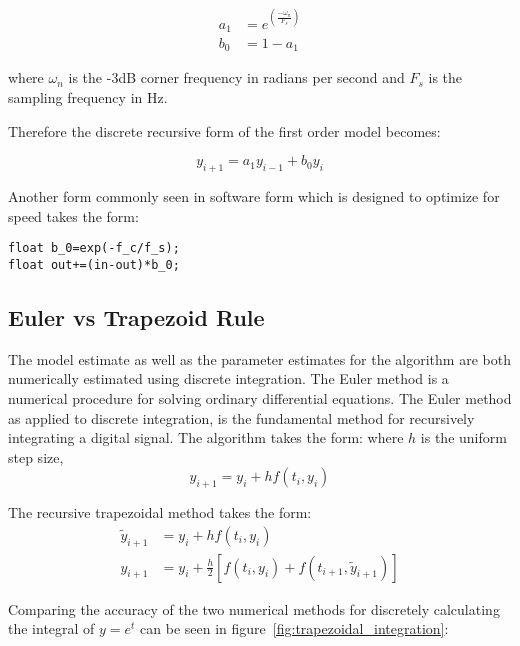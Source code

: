 \begin{equation}\label{eq:first_order_coeffieicnts}
\begin{split}
	a_1&=e^{\left(\frac{-\omega_n}{F_s}\right)}  \\
	b_0&=1-a_1
\end{split}
\end{equation}

where $\omega_n$ is the -3dB corner frequency in radians per second and $F_s$ is the sampling frequency in Hz.

Therefore the discrete recursive form of the first order model becomes:

\begin{equation}
y_{i+1}=a_1y_{i-1}+b_0y_i
\end{equation}

Another form commonly seen in software form which is designed to optimize for speed takes the form:

\begin{lstlisting}
float b_0=exp(-f_c/f_s);
float out+=(in-out)*b_0;
\end{lstlisting}

\subsection{Euler vs Trapezoid Rule}

The model estimate as well as the parameter estimates for the \Lone algorithm are both numerically estimated using discrete integration.  The Euler method is a numerical procedure for solving ordinary differential equations. The Euler method as applied to discrete integration, is the fundamental method for recursively integrating a digital signal.  The algorithm takes the form: \newline
where $h$ is the uniform step size,
\begin{equation}
y_{i+1}=y_i+hf(t_i,y_i)
\end{equation}

The recursive trapezoidal method takes the form:
\begin{equation}\label{eq:trapezoidal_integration}
\begin{split}
\tilde{y}_{i+1}&=y_i+hf(t_i,y_i) \\
y_{i+1}&=y_i+\frac{h}{2}[f(t_i,y_i)+f(t_{i+1},\tilde{y}_{i+1})]
\end{split}
\end{equation}

Comparing the accuracy of the two numerical methods for discretely calculating the integral of $y=e^t$ can be seen in figure~\ref{fig:trapezoidal_integration}:

